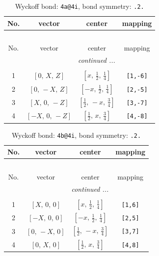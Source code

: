 \documentclass[fleqn,8pt]{jsarticle}
\begin{document}
\begin{longtable}{cccc}
\caption{Wyckoff bond: {\tt 4a@4i}, bond symmetry: {\tt .2.}}
 \\
 \hline \hline
No. & vector & center & mapping \\ \hline \endfirsthead

\multicolumn{3}{l}{\tablename\ \thetable{}} \\
 \hline \hline
No. & vector & center & mapping \\ \hline \endhead

 \hline \hline
\multicolumn{3}{r}{\footnotesize\it continued ...} \\ \endfoot

 \hline \hline
\multicolumn{3}{r}{} \\ \endlastfoot

1 & $\left[ 0,\, X,\, Z \right]$ & $\left[ x,\, \frac{1}{2},\, \frac{1}{4} \right]$ & {\tt [1,-6]} \\ \hline
2 & $\left[ 0,\, - X,\, Z \right]$ & $\left[ - x,\, \frac{1}{2},\, \frac{1}{4} \right]$ & {\tt [2,-5]} \\ \hline
3 & $\left[ X,\, 0,\, - Z \right]$ & $\left[ \frac{1}{2},\, - x,\, \frac{3}{4} \right]$ & {\tt [3,-7]} \\ \hline
4 & $\left[ - X,\, 0,\, - Z \right]$ & $\left[ \frac{1}{2},\, x,\, \frac{3}{4} \right]$ & {\tt [4,-8]} \\
\end{longtable}
\renewcommand{\arraystretch}{1.2}
\begin{longtable}{cccc}
\caption{Wyckoff bond: {\tt 4b@4i}, bond symmetry: {\tt .2.}}
 \\
 \hline \hline
No. & vector & center & mapping \\ \hline \endfirsthead

\multicolumn{3}{l}{\tablename\ \thetable{}} \\
 \hline \hline
No. & vector & center & mapping \\ \hline \endhead

 \hline \hline
\multicolumn{3}{r}{\footnotesize\it continued ...} \\ \endfoot

 \hline \hline
\multicolumn{3}{r}{} \\ \endlastfoot

1 & $\left[ X,\, 0,\, 0 \right]$ & $\left[ x,\, \frac{1}{2},\, \frac{1}{4} \right]$ & {\tt [1,6]} \\ \hline
2 & $\left[ - X,\, 0,\, 0 \right]$ & $\left[ - x,\, \frac{1}{2},\, \frac{1}{4} \right]$ & {\tt [2,5]} \\ \hline
3 & $\left[ 0,\, - X,\, 0 \right]$ & $\left[ \frac{1}{2},\, - x,\, \frac{3}{4} \right]$ & {\tt [3,7]} \\ \hline
4 & $\left[ 0,\, X,\, 0 \right]$ & $\left[ \frac{1}{2},\, x,\, \frac{3}{4} \right]$ & {\tt [4,8]} \\
\end{longtable}
\end{document}
